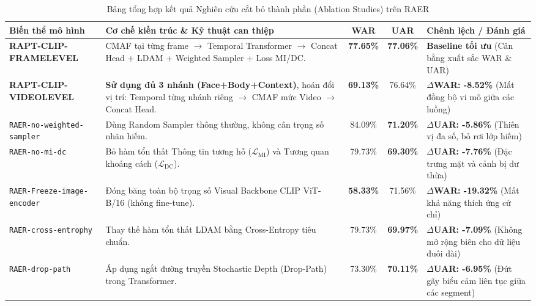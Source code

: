 \documentclass[10pt,a4paper]{article}
\begin{document}
\begin{table}[H]
\centering
\small
\caption{Bảng tổng hợp kết quả Nghiên cứu cắt bỏ thành phần (Ablation Studies) trên RAER}
\label{tab:ablation}
\begin{tabularx}{\textwidth}{p{4.2cm} X c c p{3.2cm}}
\toprule
\rowcolor{tableheader}
\textbf{Biến thể mô hình} & \textbf{Cơ chế kiến trúc \& Kỹ thuật can thiệp} & \textbf{WAR} & \textbf{UAR} & \textbf{Chênh lệch / Đánh giá} \\
\midrule
\rowcolor{grouprow}
\textbf{RAPT-CLIP-FRAMELEVEL} & CMAF tại từng frame $\rightarrow$ Temporal Transformer $\rightarrow$ Concat Head + LDAM + Weighted Sampler + Loss MI/DC. & \textbf{77.65\%} & \textbf{77.06\%} & \textbf{Baseline tối ưu} (Cân bằng xuất sắc WAR \& UAR) \\
\addlinespace[2pt]
\textbf{RAPT-CLIP-VIDEOLEVEL} & \textbf{Sử dụng đủ 3 nhánh (Face+Body+Context)}, hoán đổi vị trí: Temporal từng nhánh riêng $\rightarrow$ CMAF mức Video $\rightarrow$ Concat Head. & {\color{accentred}\textbf{69.13\%}} & 76.64\% & \textbf{$\Delta$WAR: -8.52\%} (Mất đồng bộ vi mô giữa các luồng) \\
\addlinespace[2pt]
\texttt{RAER-no-weighted-sampler} & Dùng Random Sampler thông thường, không cân trọng số nhãn hiếm. & 84.09\% & {\color{accentred}\textbf{71.20\%}} & \textbf{$\Delta$UAR: -5.86\%} (Thiên vị đa số, bỏ rơi lớp hiếm) \\
\addlinespace[2pt]
\texttt{RAER-no-mi-dc} & Bỏ hàm tổn thất Thông tin tương hỗ ($\mathcal{L}_{\text{MI}}$) và Tương quan khoảng cách ($\mathcal{L}_{\text{DC}}$). & 79.73\% & {\color{accentred}\textbf{69.30\%}} & \textbf{$\Delta$UAR: -7.76\%} (Đặc trưng mặt và cảnh bị dư thừa) \\
\addlinespace[2pt]
\texttt{RAER-Freeze-image-encoder} & Đóng băng toàn bộ trọng số Visual Backbone CLIP ViT-B/16 (không fine-tune). & {\color{accentred}\textbf{58.33\%}} & 71.56\% & \textbf{$\Delta$WAR: -19.32\%} (Mất khả năng thích ứng cử chỉ) \\
\addlinespace[2pt]
\texttt{RAER-cross-entrophy} & Thay thế hàm tổn thất LDAM bằng Cross-Entropy tiêu chuẩn. & 79.73\% & {\color{accentred}\textbf{69.97\%}} & \textbf{$\Delta$UAR: -7.09\%} (Không mở rộng biên cho dữ liệu đuôi dài) \\
\addlinespace[2pt]
\texttt{RAER-drop-path} & Áp dụng ngắt đường truyền Stochastic Depth (Drop-Path) trong Transformer. & 73.30\% & {\color{accentred}\textbf{70.11\%}} & \textbf{$\Delta$UAR: -6.95\%} (Đứt gãy biểu cảm liên tục giữa các segment) \\
\bottomrule
\end{tabularx}
\end{table}
\end{document}

